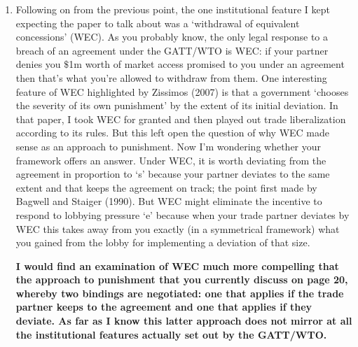 \documentclass[12pt]{article}
\begin{document}
\begin{enumerate}
	\item Following on from the previous point, the one institutional feature I kept expecting the paper to talk about was a `withdrawal of equivalent concessions' (WEC).  As you probably know, the only legal response to a breach of an agreement under the GATT/WTO is WEC: if your partner denies you $\$$1m worth of market access promised to you under an agreement then that's what you're allowed to withdraw from them.  One interesting feature of WEC highlighted by Zissimos (2007) is that a government `chooses the severity of its own punishment' by the extent of its initial deviation.  In that paper, I took WEC for granted and then played out trade liberalization according to its rules.  But this left open the question of why WEC made sense as an approach to punishment.  Now I'm wondering whether your framework offers an answer.  Under WEC, it is worth deviating from the agreement in proportion to `s' because your partner deviates to the same extent and that keeps the agreement on track; the point first made by Bagwell and Staiger (1990).  But WEC might eliminate the incentive to respond to lobbying pressure `e' because when your trade partner deviates by WEC this takes away from you exactly (in a symmetrical framework) what you gained from the lobby for implementing a deviation of that size.
 
\textbf{I would find an examination of WEC much more compelling that the approach to punishment that you currently discuss on page 20, whereby two bindings are negotiated: one that applies if the trade partner keeps to the agreement and one that applies if they deviate.  As far as I know this latter approach does not mirror at all the institutional features actually set out by the GATT/WTO.}
 

\end{enumerate}
\end{document}
